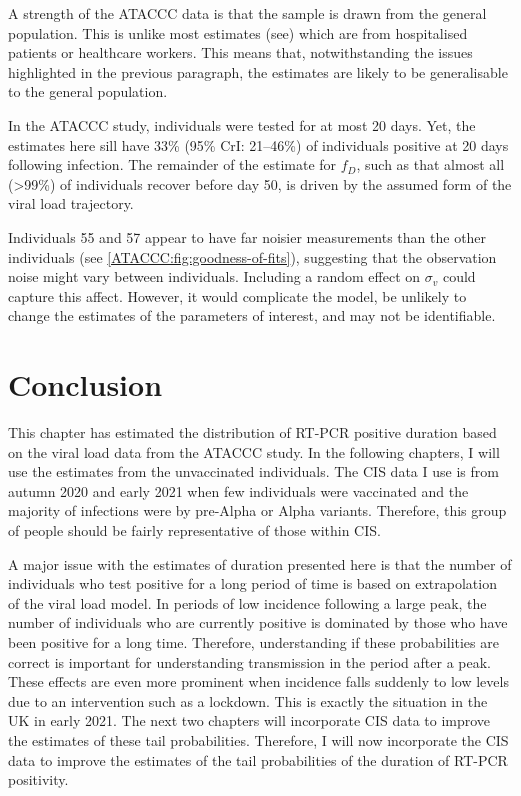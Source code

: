 \documentclass[thesis.tex]{subfiles}
\begin{document}
A strength of the ATACCC data is that the sample is drawn from the general population.
This is unlike most estimates (see) which are from hospitalised patients or healthcare workers.
This means that, notwithstanding the issues highlighted in the previous paragraph, the estimates are likely to be generalisable to the general population.

In the ATACCC study, individuals were tested for at most 20 days.
Yet, the estimates here sill have 33\% (95\% CrI: 21--46\%) of individuals positive at 20 days following infection.
The remainder of the estimate for $f_D$, such as that almost all (>99\%) of individuals recover before day 50, is driven by the assumed form of the viral load trajectory.

Individuals 55 and 57 appear to have far noisier measurements than the other individuals (see \cref{ATACCC:fig:goodness-of-fits}), suggesting that the observation noise might vary between individuals.
Including a random effect on $\sigma_v$ could capture this affect.
However, it would complicate the model, be unlikely to change the estimates of the parameters of interest, and may not be identifiable.

\section{Conclusion}

This chapter has estimated the distribution of RT-PCR positive duration based on the viral load data from the ATACCC study.
In the following chapters, I will use the estimates from the unvaccinated individuals.
The CIS data I use is from autumn 2020 and early 2021 when few individuals were vaccinated and the majority of infections were by pre-Alpha or Alpha variants.
Therefore, this group of people should be fairly representative of those within CIS.

A major issue with the estimates of duration presented here is that the number of individuals who test positive for a long period of time is based on extrapolation of the viral load model.
In periods of low incidence following a large peak, the number of individuals who are currently positive is dominated by those who have been positive for a long time.
Therefore, understanding if these probabilities are correct is important for understanding transmission in the period after a peak.
These effects are even more prominent when incidence falls suddenly to low levels due to an intervention such as a lockdown.
This is exactly the situation in the UK in early 2021.
The next two chapters will incorporate CIS data to improve the estimates of these tail probabilities.
Therefore, I will now incorporate the CIS data to improve the estimates of the tail probabilities of the duration of RT-PCR positivity.

\ifSubfilesClassLoaded{
  \appendix
  
  
  \listoftodos
}{}
\end{document}
